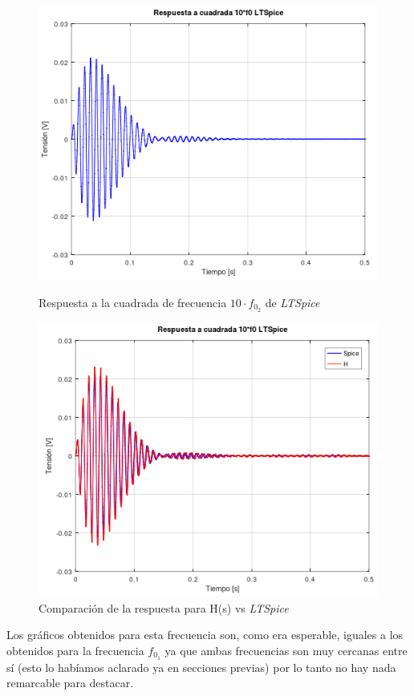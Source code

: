 \documentclass[11pt,a4paper]{report}
\begin{document}
\begin{figure}[h!]
\centering
\includegraphics[scale=1]{rtaCuadradaAlto2Spice.png}
\caption{Respuesta a la cuadrada de frecuencia $10 \cdot f_{0_{2}}$ de \textit{LTSpice}}
\includegraphics[scale=0.95]{rtaCuadradaAlto2SpiceComp.png}
\caption{Comparación de la respuesta para H(s) vs \textit{LTSpice}}
\end{figure}
\clearpage

Los gráficos obtenidos para esta frecuencia son, como era esperable, iguales a los obtenidos para la frecuencia $f_{0_{1}}$ ya que ambas frecuencias son muy cercanas entre sí (esto lo habíamos aclarado ya en secciones previas) por lo tanto no hay nada remarcable para destacar.
\end{document}
